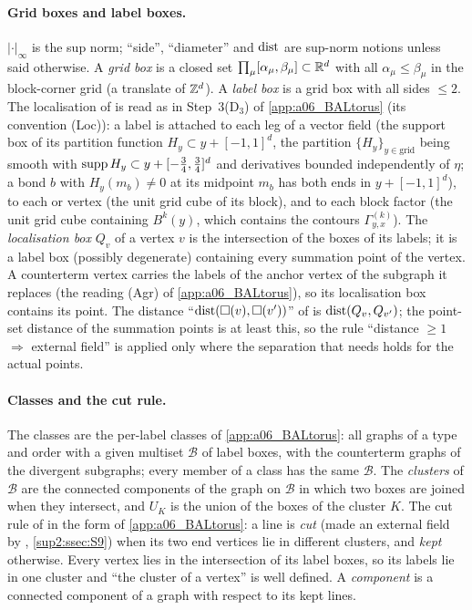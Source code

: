 \paragraph{Grid boxes and label boxes.} $|\cdot|_\infty$ is the sup norm; ``side'', ``diameter'' and $\operatorname{dist}$ are sup-norm notions unless said otherwise. A \emph{grid box} is a closed set $\prod_\mu[\alpha_\mu,\beta_\mu]\subset\mathbb R^d$ with all $\alpha_\mu\le\beta_\mu$ in the block-corner grid (a translate of $\mathbb Z^d$). A \emph{label box} is a grid box with all sides $\le2$. The localisation of \cite[p.~420]{Ba3} is read as in Step~3(D$_3$) of \cref{app:a06_BALtorus} (its convention (Loc)): a label is attached to each leg of a vector field (the support box of its partition function $H_y\subset y+[-1,1]^d$, the partition $\{H_y\}_{y\in\text{grid}}$ being smooth with $\operatorname{supp} H_y\subset y+[-\frac34,\frac34]^d$ and derivatives bounded independently of $\eta$; a bond $b$ with $H_y(m_b)\ne0$ at its midpoint $m_b$ has both ends in $y+[-1,1]^d$), to each \cite[(1.6)]{Ba3} or \cite[(1.7)]{Ba3} vertex (the unit grid cube of its block), and to each block factor \cite[(1.12)--(1.15)]{Ba3} (the unit grid cube containing $B^k(y)$, which contains the contours $\Gamma^{(k)}_{y,x}$). The \emph{localisation box} $Q_v$ of a vertex $v$ is the intersection of the boxes of its labels; it is a label box (possibly degenerate) containing every summation point of the vertex. A counterterm vertex carries the labels of the anchor vertex of the subgraph it replaces (the reading (Agr) of \cref{app:a06_BALtorus}), so its localisation box contains its point. The distance ``$\operatorname{dist}(\square(v),\square(v'))$'' of \cite[pp.~432--433]{Ba3} is $\operatorname{dist}(Q_v,Q_{v'})$; the point-set distance of the summation points is at least this, so the rule ``distance $\ge1$ $\Rightarrow$ external field'' is applied only where the separation that \cite[(3.1)]{Ba3} needs holds for the actual points.

\paragraph{Classes and the cut rule.} The classes are the per-label classes of \cref{app:a06_BALtorus}: all graphs of a type and order with a given multiset $\mathcal B$ of label boxes, with the counterterm graphs of the divergent subgraphs; every member of a class has the same $\mathcal B$. The \emph{clusters} of $\mathcal B$ are the connected components of the graph on $\mathcal B$ in which two boxes are joined when they intersect, and $U_K$ is the union of the boxes of the cluster $K$. The cut rule of \cite[p.~432]{Ba3} in the form of \cref{app:a06_BALtorus}: a line is \emph{cut} (made an external field by \cite[(3.1)]{Ba3}, \cref{sup2:ssec:S9}) when its two end vertices lie in different clusters, and \emph{kept} otherwise. Every vertex lies in the intersection of its label boxes, so its labels lie in one cluster and ``the cluster of a vertex'' is well defined. A \emph{component} is a connected component of a graph with respect to its kept lines.

